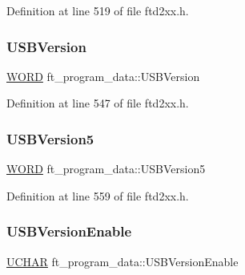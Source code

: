 Definition at line 519 of file ftd2xx.\+h.

\mbox{\label{structft__program__data_a84fc61b75cabaf452a5f5c880d261dc6}} 
\subsubsection{\texorpdfstring{U\+S\+B\+Version}{USBVersion}}
{\footnotesize\ttfamily \hyperlink{CatCaloProto40MHz_2inc_2WinTypes_8h_a197942eefa7db30960ae396d68339b97}{W\+O\+RD} ft\+\_\+program\+\_\+data\+::\+U\+S\+B\+Version}



Definition at line 547 of file ftd2xx.\+h.

\mbox{\label{structft__program__data_a0cbc74e54699448f0dcd464d057201b0}} 
\subsubsection{\texorpdfstring{U\+S\+B\+Version5}{USBVersion5}}
{\footnotesize\ttfamily \hyperlink{CatCaloProto40MHz_2inc_2WinTypes_8h_a197942eefa7db30960ae396d68339b97}{W\+O\+RD} ft\+\_\+program\+\_\+data\+::\+U\+S\+B\+Version5}



Definition at line 559 of file ftd2xx.\+h.

\mbox{\label{structft__program__data_adf5b7a284900e2dbb3d310225f85737e}} 
\subsubsection{\texorpdfstring{U\+S\+B\+Version\+Enable}{USBVersionEnable}}
{\footnotesize\ttfamily \hyperlink{CatCaloProto40MHz_2inc_2WinTypes_8h_a4f4bb67531a9bf6f0b9c6ad76aeba587}{U\+C\+H\+AR} ft\+\_\+program\+\_\+data\+::\+U\+S\+B\+Version\+Enable}



